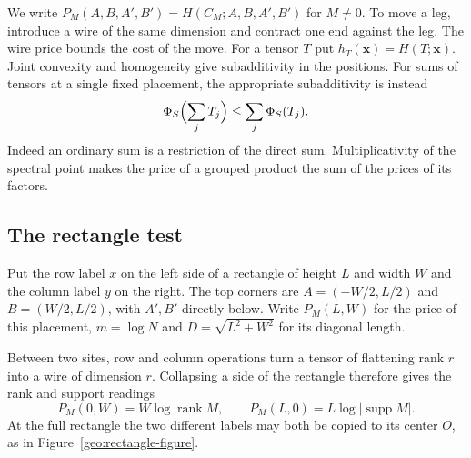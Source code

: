 We write $P_M(A,B,A',B')=H(C_M;A,B,A',B')$ for $M\ne0$. To move
a leg, introduce a wire of the same dimension and contract one end
against the leg. The wire price bounds the cost of the move.
For a tensor $T$ put $h_T(\mathbf x)=H(T;\mathbf x)$.
Joint convexity and homogeneity give subadditivity in the positions.
For sums of tensors at a single fixed placement, the appropriate
subadditivity is instead
\begin{equation}\label{geo:sum}
   \Phi_S\Bigl(\sum_j T_j\Bigr)\le\sum_j\Phi_S(T_j).
\end{equation}
Indeed an ordinary sum is a restriction of the direct sum.
Multiplicativity of the spectral point makes the price of a grouped product the sum of the prices of its factors.

\subsection{The rectangle test}

Put the row label $x$ on the left side of a rectangle of height $L$ and
width $W$ and the column label $y$ on the right. The top corners
are $A=(-W/2,L/2)$ and $B=(W/2,L/2)$, with $A',B'$ directly below.
Write $P_M(L,W)$ for the price of this placement, $m=\log N$ and
$D=\sqrt{L^2+W^2}$ for its diagonal length.

Between two sites, row and column operations turn a tensor of flattening
rank $r$ into a wire of dimension $r$. Collapsing a side of the
rectangle therefore gives the rank and support readings
\begin{equation}\label{geo:endpoints}
   P_M(0,W)=W\log\operatorname{rank}M,\qquad
   P_M(L,0)=L\log|\operatorname{supp}M|.
\end{equation}
At the full rectangle the two different labels may both be copied
to its center $O$, as in Figure~\ref{geo:rectangle-figure}.

